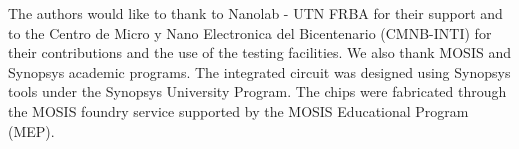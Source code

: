 The authors would like to thank to Nanolab - UTN FRBA for their support and to the Centro de Micro y Nano Electronica del Bicentenario (CMNB-INTI) \cite{cmnb} for their contributions and the use of the testing facilities. 
We also thank MOSIS and Synopsys academic programs.
The integrated circuit was designed using Synopsys \cite{synopsys} tools under the Synopsys University Program. The chips were fabricated through the MOSIS foundry service supported by the MOSIS Educational Program (MEP).
